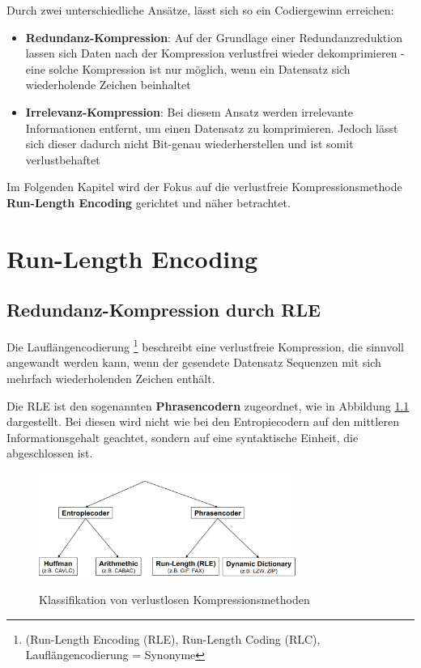 \documentclass[11pt,a4paper,ngerman]{report}
\begin{document}
		Durch zwei unterschiedliche Ansätze, lässt sich so ein Codiergewinn erreichen:
	
		\begin{itemize}
		\item \textbf{Redundanz-Kompression}: 
		Auf der Grundlage einer Redundanzreduktion lassen sich Daten nach der Kompression verlustfrei wieder dekomprimieren - eine solche Kompression ist nur möglich, wenn ein Datensatz sich wiederholende Zeichen beinhaltet
		
		\item \textbf{Irrelevanz-Kompression}:
		Bei diesem Ansatz werden irrelevante Informationen entfernt, um einen Datensatz zu komprimieren. Jedoch lässt sich dieser dadurch nicht Bit-genau wiederherstellen und ist somit verlustbehaftet
		\end{itemize}
	
	
		Im Folgenden Kapitel wird der Fokus auf die verlustfreie Kompressionsmethode \textbf{Run-Length Encoding} gerichtet und näher betrachtet.
	
	
	\chapter{Run-Length Encoding}	
  		\section{Redundanz-Kompression durch RLE}
  		
  		
  		  Die Lauflängencodierung \footnote{(Run-Length Encoding (RLE), Run-Length Coding (RLC), Lauflängencodierung = Synonyme} beschreibt eine verlustfreie Kompression, die sinnvoll angewandt werden kann, wenn der gesendete Datensatz Sequenzen mit sich mehrfach wiederholenden Zeichen enthält.
  		  
  		  
  		  Die RLE ist den sogenannten \textbf{Phrasencodern} zugeordnet, wie in Abbildung \ref{MMK} dargestellt. Bei diesen wird nicht wie bei den Entropiecodern auf den mittleren Informationsgehalt geachtet, sondern auf eine syntaktische Einheit, die abgeschlossen ist.
  		  
  		  \begin{figure} [H]
  		  	\begin{center}
  		  		\includegraphics[width=0.75\textwidth]{MMK_RLE.png}
  		  		\caption{Klassifikation von verlustlosen Kompressionsmethoden}
  		  		\cite[Seite 8]{MMK}
  		  		\label{MMK}
  		  	\end{center}
  		  \end{figure}
  		  
\end{document}
